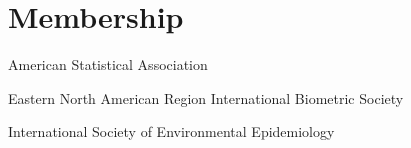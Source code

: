 \section{Membership}

American Statistical Association

Eastern North American Region International Biometric Society

International Society of Environmental Epidemiology
